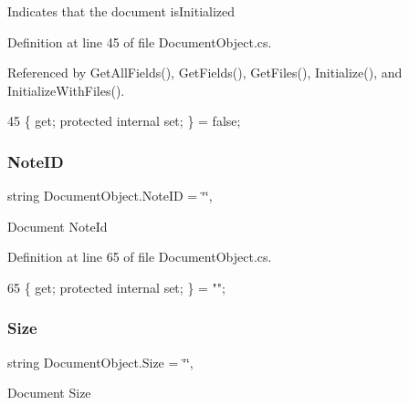 Indicates that the document is\+Initialized 



Definition at line 45 of file Document\+Object.\+cs.



Referenced by Get\+All\+Fields(), Get\+Fields(), Get\+Files(), Initialize(), and Initialize\+With\+Files().


\begin{DoxyCode}
45 \{ \textcolor{keyword}{get}; \textcolor{keyword}{protected} \textcolor{keyword}{internal} \textcolor{keyword}{set}; \} = \textcolor{keyword}{false};
\end{DoxyCode}
\mbox{\label{class_document_object_ac447461e3dc7f8258695f902ef0758a7}} 
\subsubsection{\texorpdfstring{Note\+ID}{NoteID}}
{\footnotesize\ttfamily string Document\+Object.\+Note\+ID = \char`\"{}\char`\"{}\hspace{0.3cm}{\ttfamily [get]}, {\ttfamily [set]}}



Document Note\+Id 



Definition at line 65 of file Document\+Object.\+cs.


\begin{DoxyCode}
65 \{ \textcolor{keyword}{get}; \textcolor{keyword}{protected} \textcolor{keyword}{internal} \textcolor{keyword}{set}; \} = \textcolor{stringliteral}{""};
\end{DoxyCode}
\mbox{\label{class_document_object_abdc1a6dfc1bb2261b523cf94468448b9}} 
\subsubsection{\texorpdfstring{Size}{Size}}
{\footnotesize\ttfamily string Document\+Object.\+Size = \char`\"{}\char`\"{}\hspace{0.3cm}{\ttfamily [get]}, {\ttfamily [set]}}



Document Size 



